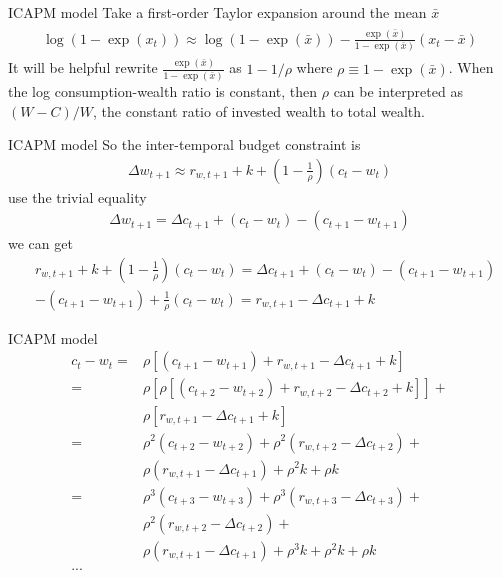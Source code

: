 \documentclass{beamer}
\begin{document}
\begin{frame}{ICAPM model}
	Take a first-order Taylor expansion around the mean $ \bar{x} $
	\begin{align}
		\begin{array}{l}
			\log \left(1-\exp \left(x_{t}\right)\right) \approx \log (1-\exp (\bar{x}))
			-\frac{\exp (\bar{x})}{1-\exp (\bar{x})}\left(x_{t}-\bar{x}\right)
		\end{array}
	\end{align}
	It will be helpful rewrite $\frac{\exp (\bar{x})}{1-\exp (\bar{x})}$ as $ 1-1/\rho $ where $\rho \equiv 1 -  \exp (\bar{x})$. When the log consumption-wealth ratio is constant, then $ \rho $ can be interpreted as $ (W - C)/ W $, the constant ratio of invested wealth to total wealth.
\end{frame}

\begin{frame}{ICAPM model}
	So the inter-temporal budget constraint is
	\begin{align}
		\Delta w_{t+1} \approx r_{w,t+1}+k+\left(1-\frac{1}{\rho}\right)\left(c_{t}-w_{t}\right)
	\end{align}
	use the trivial equality
	\begin{align}
		\Delta w_{t+1}= \Delta c_{t+1}+\left(c_{t}-w_{t}\right)  -\left(c_{t+1}-w_{t+1}\right)
	\end{align}
	we can get
	\begin{align}
		&r_{w,t+1}+k+\left(1-\frac{1}{\rho}\right)\left(c_{t}-w_{t}\right) = \Delta c_{t+1}+\left(c_{t}-w_{t}\right)  -\left(c_{t+1}-w_{t+1}\right)\\
		&-\left(c_{t+1}-w_{t+1}\right)+\frac{1}{\rho}\left(c_{t}-w_{t}\right)=r_{w, t+1}-\Delta c_{t+1}+k
	\end{align}
\end{frame}

\begin{frame}{ICAPM model}
	\begin{align*}
		c_{t}-w_{t}=&\rho \left[\left(c_{t+1}-w_{t+1}\right)+r_{w,t+1}-\Delta c_{t+1}+k\right]\\
		= &\rho \left[\rho \left[\left(c_{t+2}-w_{t+2}\right)+r_{w,t+2}-\Delta c_{t+2}+k\right] \right] + \\
		& \rho \left[ r_{w,t+1}-\Delta c_{t+1}+k \right]\\
		= & \rho^2 \left(c_{t+2}-w_{t+2}\right) + \rho^2 \left(r_{w,t+2}-\Delta c_{t+2}\right) + \\
		& \rho \left(r_{w,t+1}-\Delta c_{t+1}\right) + \rho^2 k + \rho k \\
		= & \rho^3 \left(c_{t+3}-w_{t+3}\right) + \rho^3 \left(r_{w,t+3}-\Delta c_{t+3}\right) + \\
		& \rho^2 \left(r_{w,t+2}-\Delta c_{t+2}\right) + \\
		& \rho \left(r_{w,t+1}-\Delta c_{t+1}\right)+ \rho^3 k + \rho^2 k + \rho k \\
		...\\
	\end{align*}
\end{frame}
\end{document}
